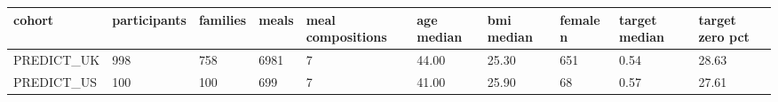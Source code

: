{\footnotesize\setlength{\tabcolsep}{3pt}
\begin{longtable}{llllllllll}
\toprule
\textbf{cohort} & \textbf{participants} & \textbf{families} & \textbf{meals} & \textbf{meal compositions} & \textbf{age median} & \textbf{bmi median} & \textbf{female n} & \textbf{target median} & \textbf{target zero pct} \\
\midrule
\endhead
PREDICT\_UK & 998 & 758 & 6981 & 7 & 44.00 & 25.30 & 651 & 0.54 & 28.63 \\
PREDICT\_US & 100 & 100 & 699 & 7 & 41.00 & 25.90 & 68 & 0.57 & 27.61 \\
\bottomrule
\end{longtable}}
